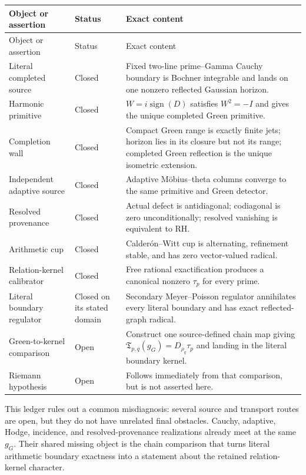 \documentclass[11pt]{article}
\theoremstyle{definition}
\theoremstyle{remark}
\numberwithin{equation}{section}
\begin{document}
\begin{longtable}{>{\raggedright\arraybackslash}p{}
                  >{\raggedright\arraybackslash}p{}
                  >{\raggedright\arraybackslash}p{}}
\toprule
Object or assertion & Status & Exact content \\
\midrule
\endfirsthead
\toprule
Object or assertion & Status & Exact content \\
\midrule
\endhead
Literal completed source & Closed & Fixed two-line prime--Gamma Cauchy
boundary is Bochner integrable and lands on one nonzero reflected Gaussian
horizon.\\
Harmonic primitive & Closed & $W=i\operatorname{sign}(D)$ satisfies
$W^2=-I$ and gives the unique completed Green primitive.\\
Completion wall & Closed & Compact Green range is exactly finite jets;
horizon lies in its closure but not its range; completed Green reflection is
the unique isometric extension.\\
Independent adaptive source & Closed & Adaptive M\"obius--theta columns
converge to the same primitive and Green detector.\\
Resolved provenance & Closed & Actual defect is antidiagonal; codiagonal is
zero unconditionally; resolved vanishing is equivalent to RH.\\
Arithmetic cup & Closed & Calder\'on--Witt cup is alternating, refinement
stable, and has zero vector-valued radical.\\
Relation-kernel calibrator & Closed & Free rational exactification produces
a canonical nonzero $\tau_p$ for every prime.\\
Literal boundary regulator & Closed on its stated domain & Secondary
Meyer--Poisson regulator annihilates every literal boundary and has exact
reflected-graph radical.\\
Green-to-kernel comparison & Open & Construct one source-defined chain map
giving $\mathfrak T_{p,q}(g_G)=D_{\rho_q}\tau_p$ and landing in the literal
boundary kernel.\\
Riemann hypothesis & Open & Follows immediately from that comparison, but
is not asserted here.\\
\bottomrule
\end{longtable}

This ledger rules out a common misdiagnosis: several source and transport
routes are open, but they do not have unrelated final obstacles.  Cauchy,
adaptive, Hodge, incidence, and resolved-provenance realizations already
meet at the same $g_G$.  Their shared missing object is the chain comparison
that turns literal arithmetic boundary exactness into a statement about the
retained relation-kernel character.
\end{document}
